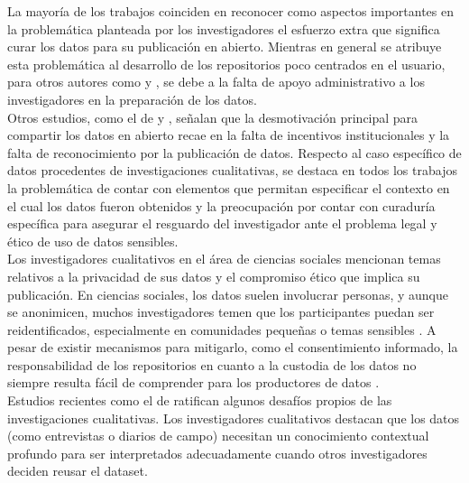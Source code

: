 \documentclass[runningheads]{llncs}
\def \bchgon {\begin{color}{blue}}
\def \echgon {\end{color}}
\def \bchedel {\begin{color}{cyan}}
\def \echedel {\end{color}}
\begin{document}
La mayoría de los trabajos coinciden en reconocer como aspectos importantes en la problemática planteada por los investigadores el esfuerzo extra que significa curar los datos para su publicación en abierto.  Mientras en general se atribuye esta problemática al desarrollo de los repositorios poco centrados en el usuario, para otros autores como \citet{borycz2023} y \citet{casali2022open}, se debe a la falta de apoyo administrativo a los investigadores en la preparación de los datos.\\

Otros estudios, como el de \citet{grattarola2024gaps} y \citet{ mabile2025recommendations}, señalan que la desmotivación principal para compartir los datos en abierto  recae en la falta de incentivos institucionales y la falta de reconocimiento por la publicación de datos.
Respecto al caso específico de datos procedentes de investigaciones cualitativas, se destaca en todos los trabajos la problemática de contar con elementos que permitan especificar el contexto en el cual los datos fueron obtenidos y la preocupación por contar con curaduría específica para asegurar el resguardo del investigador ante el problema legal y ético de uso de datos sensibles.\\

Los investigadores cualitativos en el área de ciencias sociales mencionan temas relativos a la privacidad de sus datos y el compromiso ético que implica su publicación. En ciencias sociales, los datos suelen involucrar personas, y aunque se anonimicen, muchos investigadores temen que los participantes puedan ser reidentificados, especialmente en comunidades pequeñas o temas sensibles \citep{kraehmer2023}. A pesar de existir mecanismos para mitigarlo, como el consentimiento informado, la responsabilidad de los repositorios en cuanto a la custodia de los datos no siempre resulta fácil de comprender para los productores de datos \citep{prosser2022}.\\

Estudios recientes como el de \citet{Lamb2024} ratifican algunos desafíos propios de las investigaciones cualitativas. Los investigadores cualitativos destacan que los datos (como entrevistas o diarios de campo) necesitan un conocimiento contextual profundo para ser interpretados adecuadamente cuando otros investigadores deciden reusar el dataset. \\

\end{document}
